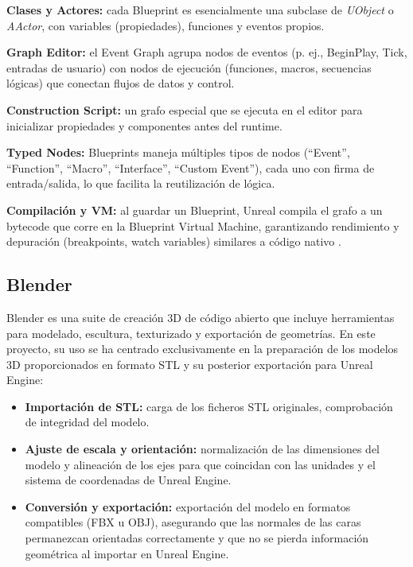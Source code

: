 \textbf{Clases y Actores:} cada Blueprint es esencialmente una subclase de \textit{UObject} o \textit{AActor}, con variables (propiedades), funciones y eventos propios.

\textbf{Graph Editor:} el Event Graph agrupa nodos de eventos (p. ej., BeginPlay, Tick, entradas de usuario) con nodos de ejecución (funciones, macros, secuencias lógicas) que conectan flujos de datos y control.

\textbf{Construction Script:} un grafo especial que se ejecuta en el editor para inicializar propiedades y componentes antes del runtime.

\textbf{Typed Nodes:} Blueprints maneja múltiples tipos de nodos (“Event”, “Function”, “Macro”, “Interface”, “Custom Event”), cada uno con firma de entrada/salida, lo que facilita la reutilización de lógica.

\textbf{Compilación y VM:} al guardar un Blueprint, Unreal compila el grafo a un bytecode que corre en la Blueprint Virtual Machine, garantizando rendimiento y depuración (breakpoints, watch variables) similares a código nativo \cite{epicBlueprints}.

\subsection{Blender}

Blender es una suite de creación 3D de código abierto que incluye herramientas para modelado, escultura, texturizado y exportación de geometrías. En este proyecto, su uso se ha centrado exclusivamente en la preparación de los modelos 3D proporcionados en formato STL y su posterior exportación para Unreal Engine:

\begin{itemize}
  \item \textbf{Importación de STL:} carga de los ficheros STL originales, comprobación de integridad del modelo.
  \item \textbf{Ajuste de escala y orientación:} normalización de las dimensiones del modelo y alineación de los ejes para que coincidan con las unidades y el sistema de coordenadas de Unreal Engine.
  \item \textbf{Conversión y exportación:} exportación del modelo en formatos compatibles (FBX u OBJ), asegurando que las normales de las caras permanezcan orientadas correctamente y que no se pierda información geométrica al importar en Unreal Engine.
  
\end{itemize}